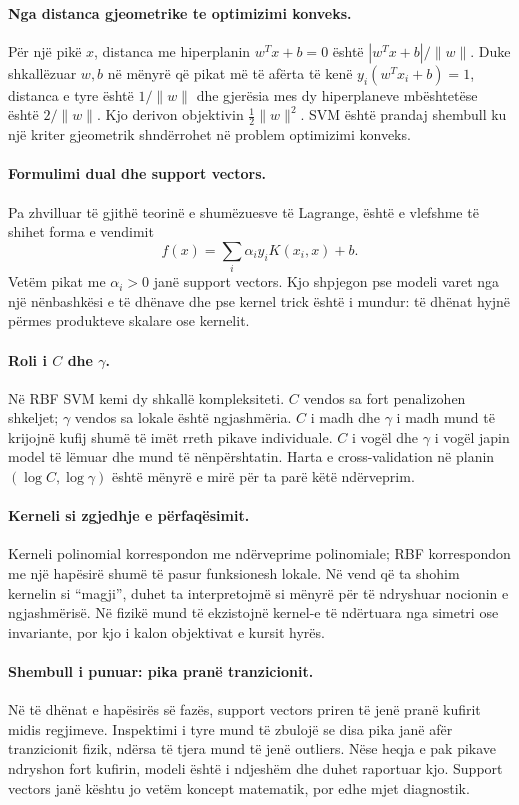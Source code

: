 \documentclass[12pt,a4paper,oneside]{book}
\begin{document}
\paragraph{Nga distanca gjeometrike te optimizimi konveks.}
Për një pikë $x$, distanca me hiperplanin $w^Tx+b=0$ është $|w^Tx+b|/\|w\|$. Duke shkallëzuar $w,b$ në mënyrë që pikat më të afërta të kenë $y_i(w^Tx_i+b)=1$, distanca e tyre është $1/\|w\|$ dhe gjerësia mes dy hiperplaneve mbështetëse është $2/\|w\|$. Kjo derivon objektivin $\tfrac12\|w\|^2$. SVM është prandaj shembull ku një kriter gjeometrik shndërrohet në problem optimizimi konveks.

\paragraph{Formulimi dual dhe support vectors.}
Pa zhvilluar të gjithë teorinë e shumëzuesve të Lagrange, është e vlefshme të shihet forma e vendimit
\[
f(x)=\sum_i\alpha_i y_i K(x_i,x)+b.
\]
Vetëm pikat me $\alpha_i>0$ janë support vectors. Kjo shpjegon pse modeli varet nga një nënbashkësi e të dhënave dhe pse kernel trick është i mundur: të dhënat hyjnë përmes produkteve skalare ose kernelit.

\paragraph{Roli i $C$ dhe $\gamma$.}
Në RBF SVM kemi dy shkallë kompleksiteti. $C$ vendos sa fort penalizohen shkeljet; $\gamma$ vendos sa lokale është ngjashmëria. $C$ i madh dhe $\gamma$ i madh mund të krijojnë kufij shumë të imët rreth pikave individuale. $C$ i vogël dhe $\gamma$ i vogël japin model të lëmuar dhe mund të nënpërshtatin. Harta e cross-validation në planin $(\log C,\log\gamma)$ është mënyrë e mirë për ta parë këtë ndërveprim.

\paragraph{Kerneli si zgjedhje e përfaqësimit.}
Kerneli polinomial korrespondon me ndërveprime polinomiale; RBF korrespondon me një hapësirë shumë të pasur funksionesh lokale. Në vend që ta shohim kernelin si ``magji'', duhet ta interpretojmë si mënyrë për të ndryshuar nocionin e ngjashmërisë. Në fizikë mund të ekzistojnë kernel-e të ndërtuara nga simetri ose invariante, por kjo i kalon objektivat e kursit hyrës.

\paragraph{Shembull i punuar: pika pranë tranzicionit.}
Në të dhënat e hapësirës së fazës, support vectors priren të jenë pranë kufirit midis regjimeve. Inspektimi i tyre mund të zbulojë se disa pika janë afër tranzicionit fizik, ndërsa të tjera mund të jenë outliers. Nëse heqja e pak pikave ndryshon fort kufirin, modeli është i ndjeshëm dhe duhet raportuar kjo. Support vectors janë kështu jo vetëm koncept matematik, por edhe mjet diagnostik.
\end{document}
